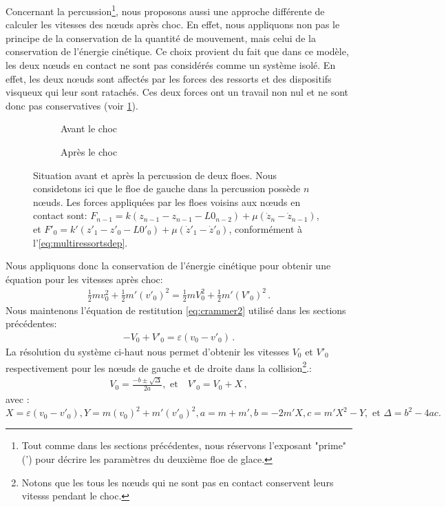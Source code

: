 Concernant la percussion\footnote{Tout comme dans les sections précédentes, nous réservons l'exposant "prime" (') pour décrire les paramètres du deuxième floe de glace.}, nous proposons aussi une approche différente de calculer les vitesses des n\oe{}uds après choc. En effet, nous appliquons non pas le principe de la conservation de la quantité de mouvement, mais celui de la conservation de l'énergie cinétique. Ce choix provient du fait que dans ce modèle, les deux n\oe{}uds en contact ne sont pas considérés comme un système isolé. En effet, les deux n\oe{}uds sont affectés par les forces des ressorts et des dispositifs visqueux qui leur sont ratachés. Ces deux forces ont un travail non nul et ne sont donc pas conservatives (voir \cref{fig:situationcontact4}). 
\begin{figure}[!h]
    \begin{subfigure}[b]{0.48\textwidth}
        \centering
        \caption{Avant le choc}
    \end{subfigure}
    \begin{subfigure}[b]{0.48\textwidth}
        \centering
        \caption{Après le choc}
    \end{subfigure}
       \caption{Situation avant et après la percussion de deux floes. Nous considetons ici que le floe de gauche dans la percussion possède $n$ n\oe{}uds. Les forces appliquées par les floes voisins aux n\oe{}uds en contact sont: $F_{n-1} = k(z_{n-1} - z_{n-1} - L0_{n-2}) + \mu (\dot z_{n} - \dot z_{n-1})$, et $F'_0 = k'(z'_1 - z'_0 - L0'_0) + \mu (\dot z'_1 - \dot z'_0)$, conformément à l'\cref{eq:multiressortsdep}.}
       \label{fig:situationcontact4}
\end{figure}
Nous appliquons donc la conservation de l'énergie cinétique pour obtenir une équation pour les vitesses après choc:
\begin{align}
    \frac{1}{2}m v_0^2 + \frac{1}{2}m' (v'_0)^2 = \frac{1}{2}m V_0^2 + \frac{1}{2}m' (V'_0)^2\,.
\end{align}
Nous maintenons l'équation de restitution \cref{eq:crammer2} utilisé dans les sections précédentes:
\begin{align}
    - V_0 + V'_0 = \varepsilon (v_0 - v'_0) \,.
\end{align}
La résolution du système ci-haut nous permet d'obtenir les vitesses $V_0$ et $V'_0$ respectivement pour les n\oe{}uds de gauche et de droite dans la collision\footnote{Notons que les tous les n\oe{}uds qui ne sont pas en contact conservent leurs vitesss pendant le choc.}.:
\begin{align}
V_0 = \frac{-b \pm \sqrt{\Delta}}{2a}, \text{ et} \quad V'_0 = V_0 + X\,,
\end{align}
avec :
$$
X= \varepsilon(v_0 - v'_0), Y = m(v_0)^2 + m'(v'_0)^2,  a = m+m', b = -2m'X, c = m'X^2 - Y, \text{ et } \Delta = b^2 - 4ac.
$$


